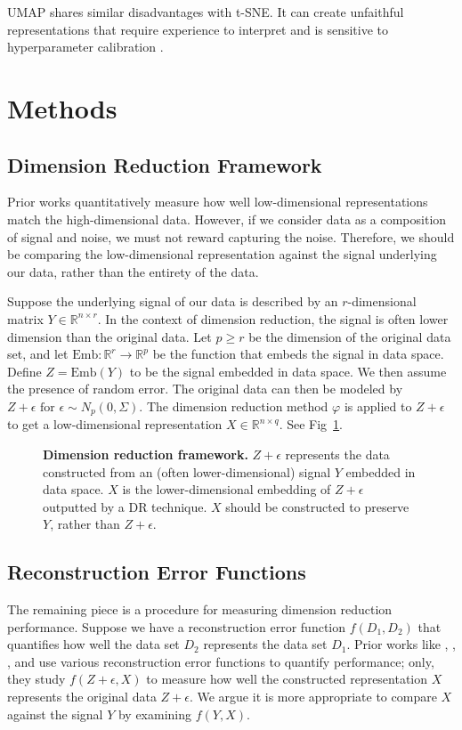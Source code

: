 \documentclass[10pt,letterpaper]{article}
\begin{document}
UMAP shares similar disadvantages with t-SNE. It can create unfaithful representations that require experience to interpret and is sensitive to hyperparameter calibration \cite{understanding UMAP}.

\section*{Methods}

\subsection*{Dimension Reduction Framework}
Prior works quantitatively measure how well low-dimensional representations match the high-dimensional data. However, if we consider data as a composition of signal and noise, we must not reward capturing the noise. Therefore, we should be comparing the low-dimensional representation against the signal underlying our data, rather than the entirety of the data.

Suppose the underlying signal of our data is described by an $r$-dimensional matrix $Y \in \mathbb{R}^{n \times r}$. In the context of dimension reduction, the signal is often lower dimension than the original data. Let $p \geq r$ be the dimension of the original data set, and let $\textrm{Emb}:\mathbb{R}^r \to \mathbb{R}^p$ be the function that embeds the signal in data space. Define $Z = \textrm{Emb}(Y)$ to be the signal embedded in data space. We then assume the presence of random error. The original data can then be modeled by $Z + \epsilon \textrm{ for } \epsilon \sim N_p(0, \Sigma)$. The dimension reduction method $\varphi$ is applied to $Z + \epsilon$ to get a low-dimensional representation $X \in \mathbb{R}^{n \times q}$. See Fig~\ref{fig1}.

\begin{figure}[!h]
\caption{{\bf Dimension reduction framework.}
$Z + \epsilon$ represents the data constructed from an (often lower-dimensional) signal $Y$ embedded in data space. $X$ is the lower-dimensional embedding of $Z + \epsilon$ outputted by a DR technique. $X$ should be constructed to preserve $Y$, rather than $Z + \epsilon$.}
\label{fig1}
\end{figure}

\subsection*{Reconstruction Error Functions}
The remaining piece is a procedure for measuring dimension reduction performance. Suppose we have a reconstruction error function $f(D_1, D_2)$ that quantifies how well the data set $D_2$ represents the data set $D_1$. Prior works like \cite{evaluation of DR transcriptomics}, \cite{t-SNE cell} , \cite{large DR unreliable}, and \cite{quantitative survey} use various reconstruction error functions to quantify performance; only, they study $f(Z + \epsilon, X)$ to measure how well the constructed representation $X$ represents the original data $Z + \epsilon$. We argue it is more appropriate to compare $X$ against the signal $Y$ by examining $f(Y, X)$.
\end{document}
